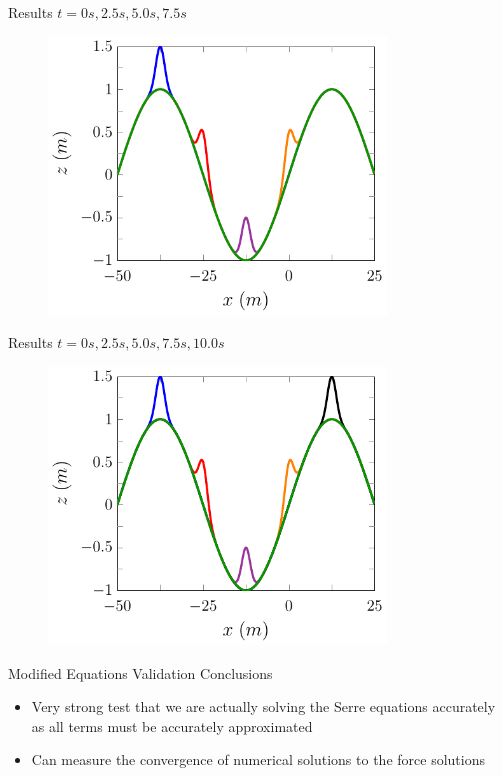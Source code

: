 \documentclass[handout]{beamer}
\begin{document}
\begin{frame}{Results $t=0s,2.5s,5.0s,7.5s$}
	\begin{figure}
		\includegraphics[width=0.8\textwidth]{./Pics/DryBed/Forced/Stages0255075.pdf}
	\end{figure}
\end{frame}

\begin{frame}{Results $t=0s,2.5s,5.0s,7.5s,10.0s$}
	\begin{figure}
		\includegraphics[width=0.8\textwidth]{./Pics/DryBed/Forced/Stages0255075100.pdf}
	\end{figure}
\end{frame}

\begin{frame}{Modified Equations Validation Conclusions}
\begin{itemize}
	\item Very strong test that we are actually solving the Serre equations accurately as all terms must be accurately approximated
	\item Can measure the convergence of numerical solutions to the force solutions
\end{itemize}
\end{frame}
\end{document}
